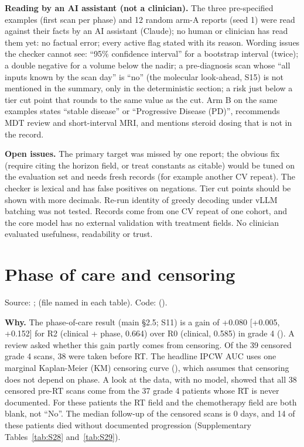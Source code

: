 \documentclass[11pt,a4paper]{article}
\begin{document}
\textbf{Reading by an AI assistant (not a clinician).} The three pre-specified examples (first scan per phase) and 12
random arm-A reports (seed 1) were read against their facts by an AI assistant (Claude); no human or clinician has
read them yet: no factual error; every active flag stated with its reason. Wording issues the
checker cannot see: ``95\% confidence interval'' for a bootstrap interval (twice); a double negative for a volume
below the nadir; a pre-diagnosis scan whose ``all inputs known by the scan day'' is ``no'' (the molecular look-ahead,
S15) is not mentioned in the summary, only in the deterministic section; a risk just below a tier cut point that
rounds to the same value as the cut. Arm B on the same examples states ``stable disease'' or ``Progressive Disease
(PD)'', recommends MDT review and short-interval MRI, and mentions steroid dosing that is not in the record.

\textbf{Open issues.} The primary target was missed by one report; the obvious fix (require citing the horizon
field, or treat constants as citable) would be tuned on the evaluation set and needs fresh records (for example
another CV repeat). The checker is lexical and has false positives on negations. Tier cut points should be shown
with more decimals. Re-run identity of greedy decoding under vLLM batching was not tested. Records come from one CV
repeat of one cohort, and the core model has no external validation with treatment fields. No clinician evaluated
usefulness, readability or trust.

\FloatBarrier
\section{Phase of care and censoring}\label{sec:S20}

Source: ;
 (file named in each table). Code:
 ().

\textbf{Why.} The phase-of-care result (main \S2.5; S11) is a gain of +0.080 [+0.005, +0.152] for R2 (clinical +
phase, 0.664) over R0 (clinical, 0.585) in grade 4 (). A review asked whether this gain
partly comes from censoring. Of the 39 censored grade 4 scans, 38 were taken before RT. The headline IPCW AUC uses one
marginal Kaplan-Meier (KM) censoring curve (), which assumes that censoring does not
depend on phase. A look at the data, with no model, showed that all 38 censored pre-RT scans come from the 37 grade 4
patients whose RT is never documented. For these patients the RT field and the chemotherapy field are both blank, not
``No''. The median follow-up of the censored scans is 0 days, and 14 of these patients died without documented
progression (Supplementary Tables~\ref{tab:S28} and~\ref{tab:S29}).
\end{document}
